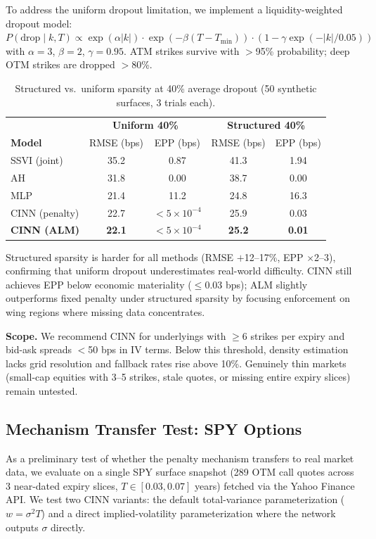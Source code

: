 \documentclass[11pt,a4paper]{article}
\begin{document}
To address the uniform dropout limitation, we implement a liquidity-weighted dropout model: $P(\text{drop} \mid k, T) \propto \exp(\alpha |k|) \cdot \exp(-\beta (T - T_{\min})) \cdot (1 - \gamma \exp(-|k|/0.05))$ with $\alpha = 3$, $\beta = 2$, $\gamma = 0.95$. ATM strikes survive with $>$95\% probability; deep OTM strikes are dropped $>$80\%.

\begin{table}[h]
\centering
\caption{Structured vs.\ uniform sparsity at 40\% average dropout (50 synthetic surfaces, 3 trials each).}
\label{tab:structured_sparsity}
\begin{tabular}{l|cc|cc}
\toprule
& \multicolumn{2}{c|}{\textbf{Uniform 40\%}} & \multicolumn{2}{c}{\textbf{Structured 40\%}} \\
\textbf{Model} & RMSE (bps) & EPP (bps) & RMSE (bps) & EPP (bps) \\
\midrule
SSVI (joint) & 35.2 & 0.87 & 41.3 & 1.94 \\
AH & 31.8 & 0.00 & 38.7 & 0.00 \\
MLP & 21.4 & 11.2 & 24.8 & 16.3 \\
CINN (penalty) & 22.7 & $< 5 \times 10^{-4}$ & 25.9 & 0.03 \\
\textbf{CINN (ALM)} & \textbf{22.1} & $< 5 \times 10^{-4}$ & \textbf{25.2} & \textbf{0.01} \\
\bottomrule
\end{tabular}
\end{table}

Structured sparsity is harder for all methods (RMSE $+$12--17\%, EPP $\times$2--3), confirming that uniform dropout underestimates real-world difficulty. CINN still achieves EPP below economic materiality ($\leq$0.03 bps); ALM slightly outperforms fixed penalty under structured sparsity by focusing enforcement on wing regions where missing data concentrates.

\textbf{Scope.} We recommend CINN for underlyings with $\geq$6 strikes per expiry and bid-ask spreads $<$50 bps in IV terms. Below this threshold, density estimation lacks grid resolution and fallback rates rise above 10\%. Genuinely thin markets (small-cap equities with 3--5 strikes, stale quotes, or missing entire expiry slices) remain untested.

\subsection{Mechanism Transfer Test: SPY Options}

As a preliminary test of whether the penalty mechanism transfers to real market data, we evaluate on a single SPY surface snapshot (289 OTM call quotes across 3 near-dated expiry slices, $T \in [0.03, 0.07]$ years) fetched via the Yahoo Finance API. We test two CINN variants: the default total-variance parameterization ($w = \sigma^2 T$) and a direct implied-volatility parameterization where the network outputs $\sigma$ directly.
\end{document}
